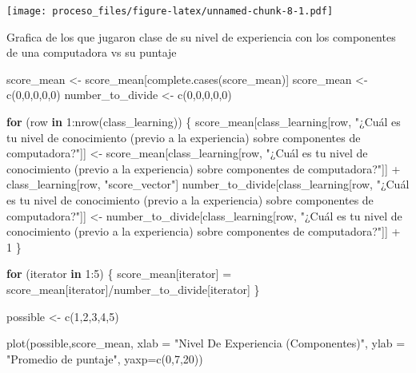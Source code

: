 \documentclass[
]{article}
\newenvironment{Shaded}{\begin{snugshade}}{\end{snugshade}}
\newcommand{\AttributeTok}[1]{\textcolor[rgb]{0.77,0.63,0.00}{#1}}
\newcommand{\ControlFlowTok}[1]{\textcolor[rgb]{0.13,0.29,0.53}{\textbf{#1}}}
\newcommand{\DecValTok}[1]{\textcolor[rgb]{0.00,0.00,0.81}{#1}}
\newcommand{\FunctionTok}[1]{\textcolor[rgb]{0.00,0.00,0.00}{#1}}
\newcommand{\NormalTok}[1]{#1}
\newcommand{\OtherTok}[1]{\textcolor[rgb]{0.56,0.35,0.01}{#1}}
\newcommand{\SpecialCharTok}[1]{\textcolor[rgb]{0.00,0.00,0.00}{#1}}
\newcommand{\StringTok}[1]{\textcolor[rgb]{0.31,0.60,0.02}{#1}}
\begin{document}
\texttt{[image: proceso\_files/figure-latex/unnamed-chunk-8-1.pdf]}

Grafica de los que jugaron clase de su nivel de experiencia con los
componentes de una computadora vs su puntaje

\begin{Shaded}
\begin{Highlighting}[]
\NormalTok{score\_mean }\OtherTok{\textless{}{-}}\NormalTok{ score\_mean[}\FunctionTok{complete.cases}\NormalTok{(score\_mean)]}
\NormalTok{score\_mean }\OtherTok{\textless{}{-}} \FunctionTok{c}\NormalTok{(}\DecValTok{0}\NormalTok{,}\DecValTok{0}\NormalTok{,}\DecValTok{0}\NormalTok{,}\DecValTok{0}\NormalTok{,}\DecValTok{0}\NormalTok{)}
\NormalTok{number\_to\_divide }\OtherTok{\textless{}{-}} \FunctionTok{c}\NormalTok{(}\DecValTok{0}\NormalTok{,}\DecValTok{0}\NormalTok{,}\DecValTok{0}\NormalTok{,}\DecValTok{0}\NormalTok{,}\DecValTok{0}\NormalTok{)}

\ControlFlowTok{for}\NormalTok{ (row }\ControlFlowTok{in} \DecValTok{1}\SpecialCharTok{:}\FunctionTok{nrow}\NormalTok{(class\_learning))}
\NormalTok{\{}
\NormalTok{  score\_mean[class\_learning[row, }\StringTok{"¿Cuál es tu nivel de conocimiento (previo a la experiencia) sobre componentes de computadora?"}\NormalTok{]] }\OtherTok{\textless{}{-}}\NormalTok{ score\_mean[class\_learning[row, }\StringTok{"¿Cuál es tu nivel de conocimiento (previo a la experiencia) sobre componentes de computadora?"}\NormalTok{]] }\SpecialCharTok{+}\NormalTok{ class\_learning[row, }\StringTok{"score\_vector"}\NormalTok{]}
\NormalTok{  number\_to\_divide[class\_learning[row, }\StringTok{"¿Cuál es tu nivel de conocimiento (previo a la experiencia) sobre componentes de computadora?"}\NormalTok{]] }\OtherTok{\textless{}{-}}\NormalTok{ number\_to\_divide[class\_learning[row, }\StringTok{"¿Cuál es tu nivel de conocimiento (previo a la experiencia) sobre componentes de computadora?"}\NormalTok{]] }\SpecialCharTok{+} \DecValTok{1}
\NormalTok{\}}

\ControlFlowTok{for}\NormalTok{ (iterator }\ControlFlowTok{in} \DecValTok{1}\SpecialCharTok{:}\DecValTok{5}\NormalTok{)}
\NormalTok{\{}
\NormalTok{  score\_mean[iterator] }\OtherTok{=}\NormalTok{ score\_mean[iterator]}\SpecialCharTok{/}\NormalTok{number\_to\_divide[iterator]}
\NormalTok{\}}

\NormalTok{possible }\OtherTok{\textless{}{-}} \FunctionTok{c}\NormalTok{(}\DecValTok{1}\NormalTok{,}\DecValTok{2}\NormalTok{,}\DecValTok{3}\NormalTok{,}\DecValTok{4}\NormalTok{,}\DecValTok{5}\NormalTok{)}

\FunctionTok{plot}\NormalTok{(possible,score\_mean, }\AttributeTok{xlab =} \StringTok{"Nivel De Experiencia (Componentes)"}\NormalTok{, }\AttributeTok{ylab =} \StringTok{"Promedio de puntaje"}\NormalTok{, }\AttributeTok{yaxp=}\FunctionTok{c}\NormalTok{(}\DecValTok{0}\NormalTok{,}\DecValTok{7}\NormalTok{,}\DecValTok{20}\NormalTok{))}
\end{Highlighting}
\end{Shaded}
\end{document}
